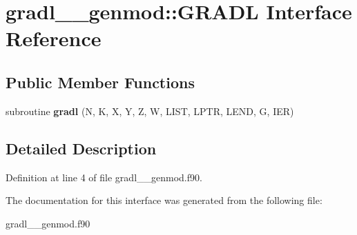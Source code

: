 \hypertarget{interfacegradl____genmod_1_1_g_r_a_d_l}{\section{gradl\+\_\+\+\_\+genmod\+:\+:G\+R\+A\+D\+L Interface Reference}
\label{interfacegradl____genmod_1_1_g_r_a_d_l}
}
\subsection*{Public Member Functions}
\begin{DoxyCompactItemize}
\item 
\hypertarget{interfacegradl____genmod_1_1_g_r_a_d_l_aac6bf99bb6d799c1b4bc352b59dc59e3}{subroutine {\bfseries gradl} (N, K, X, Y, Z, W, L\+I\+S\+T, L\+P\+T\+R, L\+E\+N\+D, G, I\+E\+R)}\label{interfacegradl____genmod_1_1_g_r_a_d_l_aac6bf99bb6d799c1b4bc352b59dc59e3}

\end{DoxyCompactItemize}


\subsection{Detailed Description}


Definition at line 4 of file gradl\+\_\+\+\_\+genmod.\+f90.



The documentation for this interface was generated from the following file\+:\begin{DoxyCompactItemize}
\item 
gradl\+\_\+\+\_\+genmod.\+f90\end{DoxyCompactItemize}

